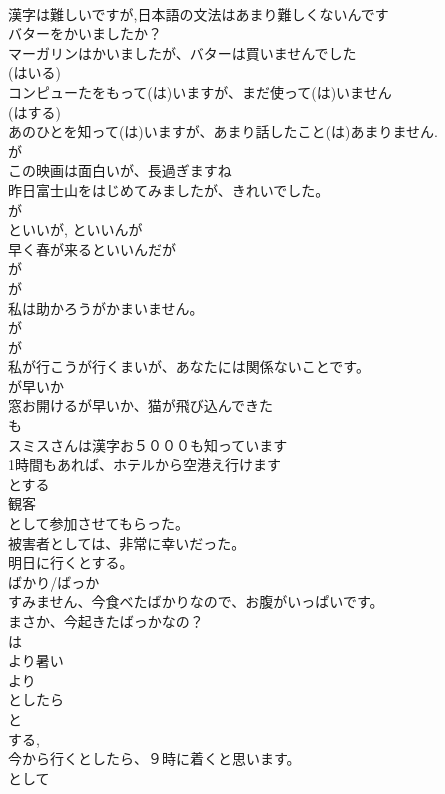 \documentclass[8pt]{extreport}
\begin{document}
\begin{CJK}{UTF8}{min}
\\	漢字は難しいですが,日本語の文法はあまり難しくないんです 
\\	バターをかいましたか？ 
\\	マーガリンはかいましたが、バターは買いませんでした
\\	(はいる)	
\\	コンピューたをもって(は)いますが、まだ使って(は)いません
\\	(はする)	
\\	あのひとを知って(は)いますが、あまり話したこと(は)あまりません. 
\\	が 
\\	この映画は面白いが、長過ぎますね
\\	昨日富士山をはじめてみましたが、きれいでした。
\\	が 
\\	といいが, といいんが	
\\	早く春が来るといいんだが
\\	が 
\\	が	
\\	私は助かろうがかまいません。
\\	が 
\\	が	
\\	私が行こうが行くまいが、あなたには関係ないことです。
\\	が早いか	
\\	窓お開けるが早いか、猫が飛び込んできた
\\	も	
\\	スミスさんは漢字お５０００も知っています 
\\	1時間もあれば、ホテルから空港え行けます
\\	とする	
\\	観客
\\	として参加させてもらった。
\\	被害者としては、非常に幸いだった。
\\	明日に行くとする。
\\	ばかり/ばっか	
\\	すみません、今食べたばかりなので、お腹がいっぱいです。
\\	まさか、今起きたばっかなの？
\\	は
\\	より暑い	
\\	より
\\	としたら	
\\	と
\\	する, 
\\	今から行くとしたら、９時に着くと思います。 
\\	として	

\end{CJK}
\end{document}
